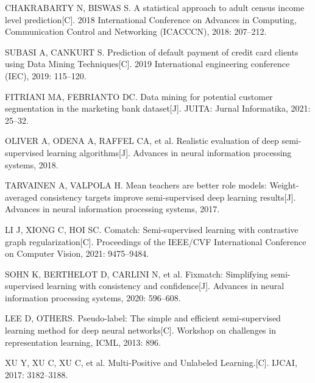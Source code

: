 \begin{thebibliography}{200}
	\wuhao %
	\linespread{1}\selectfont
	\setlength{\itemsep}{-1.4ex} %
	\thispagestyle{others}
	\pagestyle{others}
	
	\makeatletter
	\renewcommand\@biblabel[1]{[#1]\hfill} %
	\makeatother
	\setlength{\labelsep}{0cm}
	
	CHAKRABARTY N, BISWAS S. A statistical approach to adult census income level prediction[C]. 2018 International Conference on Advances in Computing, Communication Control and Networking (ICACCCN), 2018: 207--212.
	
	SUBASI A, CANKURT S. Prediction of default payment of credit card clients using Data Mining Techniques[C]. 2019 International engineering conference (IEC), 2019: 115--120.
	
	FITRIANI MA, FEBRIANTO DC. Data mining for potential customer segmentation in the marketing bank dataset[J]. JUITA: Jurnal Informatika, 2021: 25--32.
	
	OLIVER A, ODENA A, RAFFEL CA, et al. Realistic evaluation of deep semi-supervised learning algorithms[J]. Advances in neural information processing systems, 2018.
	
	TARVAINEN A, VALPOLA H. Mean teachers are better role models: Weight-averaged consistency targets improve semi-supervised deep learning results[J]. Advances in neural information processing systems, 2017.
	
	LI J, XIONG C, HOI SC. Comatch: Semi-supervised learning with contrastive graph regularization[C]. Proceedings of the IEEE/CVF International Conference on Computer Vision, 2021: 9475--9484.
	
	SOHN K, BERTHELOT D, CARLINI N, et al. Fixmatch: Simplifying semi-supervised learning with consistency and confidence[J]. Advances in neural information processing systems, 2020: 596--608.
	
	LEE D, OTHERS. Pseudo-label: The simple and efficient semi-supervised learning method for deep neural networks[C]. Workshop on challenges in representation learning, ICML, 2013: 896.
	
	XU Y, XU C, XU C, et al. Multi-Positive and Unlabeled Learning.[C]. IJCAI, 2017: 3182--3188.
	

\end{thebibliography}
